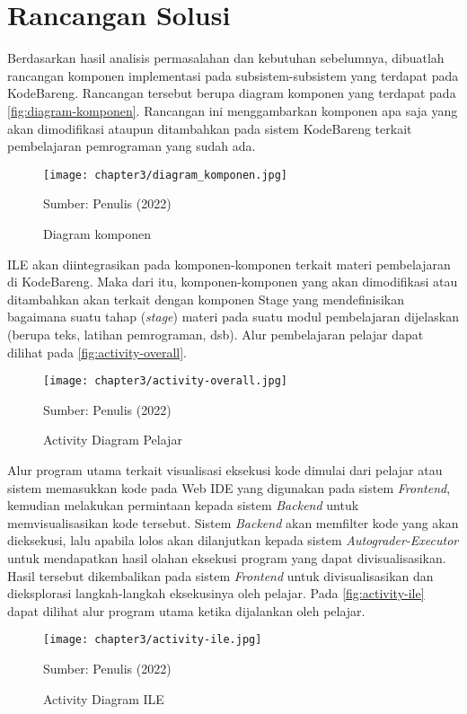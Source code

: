 \section{Rancangan Solusi}

Berdasarkan hasil analisis permasalahan dan kebutuhan sebelumnya, dibuatlah rancangan komponen implementasi pada subsistem-subsistem yang terdapat pada KodeBareng. Rancangan tersebut berupa diagram komponen yang terdapat pada \autoref{fig:diagram-komponen}. Rancangan ini menggambarkan komponen apa saja yang akan dimodifikasi ataupun ditambahkan pada sistem KodeBareng terkait pembelajaran pemrograman yang sudah ada.

\begin{figure}[!h]
  \centering
  \texttt{[image: chapter3/diagram\_komponen.jpg]}
  \caption{Diagram komponen} \label{fig:diagram-komponen}
  Sumber: Penulis (2022)
\end{figure}

ILE akan diintegrasikan pada komponen-komponen terkait materi pembelajaran di KodeBareng. Maka dari itu, komponen-komponen yang akan dimodifikasi atau ditambahkan akan terkait dengan komponen Stage yang mendefinisikan bagaimana suatu tahap (\textit{stage}) materi pada suatu modul pembelajaran dijelaskan (berupa teks, latihan pemrograman, dsb). Alur pembelajaran pelajar dapat dilihat pada \autoref{fig:activity-overall}.

\begin{figure}[!h]
  \centering
  \texttt{[image: chapter3/activity-overall.jpg]}
  \caption{Activity Diagram Pelajar} \label{fig:activity-overall}
  Sumber: Penulis (2022)
\end{figure}

Alur program utama terkait visualisasi eksekusi kode dimulai dari pelajar atau sistem memasukkan kode pada Web IDE yang digunakan pada sistem \textit{Frontend}, kemudian melakukan permintaan kepada sistem \textit{Backend} untuk memvisualisasikan kode tersebut. Sistem \textit{Backend} akan memfilter kode yang akan dieksekusi, lalu apabila lolos akan dilanjutkan kepada sistem \textit{Autograder-Executor} untuk mendapatkan hasil olahan eksekusi program yang dapat divisualisasikan. Hasil tersebut dikembalikan pada sistem \textit{Frontend} untuk divisualisasikan dan dieksplorasi langkah-langkah eksekusinya oleh pelajar. Pada \autoref{fig:activity-ile} dapat dilihat alur program utama ketika dijalankan oleh pelajar.

\begin{figure}[!h]
  \centering
  \texttt{[image: chapter3/activity-ile.jpg]}
  \caption{Activity Diagram ILE} \label{fig:activity-ile}
  Sumber: Penulis (2022)
\end{figure}

